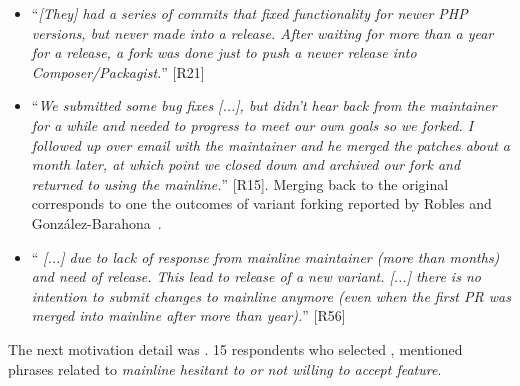 \begin{itemize}[leftmargin=*]
\item ``\emph{[They] %
had a series of commits that fixed functionality for newer PHP versions, but never made into a release. %
After waiting for more than a year for a release, a fork was done just to push a newer release into Composer/Packagist.}'' [R21]

\item ``\emph{We submitted some bug fixes [...], %
but didn't hear back from the maintainer for a while and needed to progress to meet our own goals so we forked. I followed up over email with the maintainer and he merged the patches about a month later, at which point we closed down and archived our fork and returned to using the mainline.}'' [R15].
Merging back to the original corresponds to one the outcomes of variant forking reported by Robles and Gonz{\'a}lez-Barahona~\cite{Gregorio:2012}.

\item ``\emph{%
[...] due to lack of response from mainline maintainer (more than months) and need of release. This lead to release of a new variant. [...] there is no intention to submit changes to mainline anymore (even when the first PR was merged into mainline after more than year).}'' [R56]
\end{itemize}

\nd The next  motivation detail was .
15 respondents who selected , mentioned phrases related to \emph{mainline hesitant to or not willing to accept feature}.

